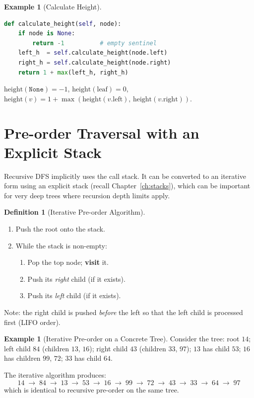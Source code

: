 \documentclass[11pt, a4paper, notitlepage]{report}
\theoremstyle{definition}
\newtheorem{definition}[theorem]{Definition}
\theoremstyle{remark}
\theoremstyle{definition}
\newtheorem{example}[theorem]{Example}
\begin{document}
\begin{example}[Calculate Height]
\label{ex:calc-height}
\leavevmode
\begin{lstlisting}[language=Python]
def calculate_height(self, node):
    if node is None:
        return -1          # empty sentinel
    left_h  = self.calculate_height(node.left)
    right_h = self.calculate_height(node.right)
    return 1 + max(left_h, right_h)
\end{lstlisting}
\end{example}

\begin{keyresult}[title={Key Result: Height Recurrence}]
$\text{height}(\texttt{None}) = -1$,\quad
$\text{height}(\text{leaf}) = 0$,\quad
$\text{height}(v) = 1 + \max(\text{height}(v.\text{left}),\,
\text{height}(v.\text{right}))$.
\end{keyresult}

\section{Pre-order Traversal with an Explicit Stack}
\label{sec:preorder-stack}

Recursive DFS implicitly uses the call stack.  It can be converted to an
iterative form using an explicit stack (recall
Chapter~\ref{ch:stacks}), which can be important for very deep trees where
recursion depth limits apply.

\begin{definition}[Iterative Pre-order Algorithm]
\label{def:iterative-preorder}
\begin{enumerate}
  \item Push the root onto the stack.
  \item While the stack is non-empty:
    \begin{enumerate}
      \item Pop the top node; \textbf{visit} it.
      \item Push its \emph{right} child (if it exists).
      \item Push its \emph{left} child (if it exists).
    \end{enumerate}
\end{enumerate}
Note: the right child is pushed \emph{before} the left so that the left child
is processed first (LIFO order).
\end{definition}

\begin{example}[Iterative Pre-order on a Concrete Tree]
\label{ex:iterative-preorder}
Consider the tree: root $14$; left child $84$ (children $13$, $16$); right
child $43$ (children $33$, $97$); $13$ has child $53$; $16$ has children
$99$, $72$; $33$ has child $64$.

The iterative algorithm produces:
\[
  14 \;\to\; 84 \;\to\; 13 \;\to\; 53 \;\to\; 16 \;\to\; 99 \;\to\; 72
     \;\to\; 43 \;\to\; 33 \;\to\; 64 \;\to\; 97
\]
which is identical to recursive pre-order on the same tree.
\end{example}
\end{document}
